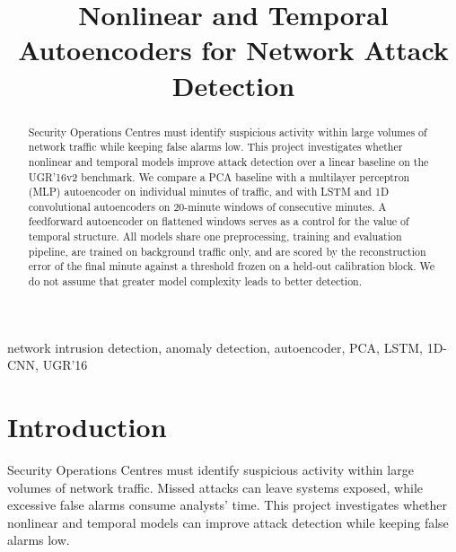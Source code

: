 \documentclass[conference]{IEEEtran}
\begin{document}
\title{Nonlinear and Temporal Autoencoders for Network Attack Detection}

\author{
\and
{}
\and
{}
\and
{}
}

\maketitle

\begin{abstract}
Security Operations Centres must identify suspicious activity within large volumes of network traffic while keeping false alarms low. This project investigates whether nonlinear and temporal models improve attack detection over a linear baseline on the UGR'16v2 benchmark. We compare a PCA baseline with a multilayer perceptron (MLP) autoencoder on individual minutes of traffic, and with LSTM and 1D convolutional autoencoders on 20-minute windows of consecutive minutes. A feedforward autoencoder on flattened windows serves as a control for the value of temporal structure. All models share one preprocessing, training and evaluation pipeline, are trained on background traffic only, and are scored by the reconstruction error of the final minute against a threshold frozen on a held-out calibration block. We do not assume that greater model complexity leads to better detection.
\end{abstract}

\begin{IEEEkeywords}
network intrusion detection, anomaly detection, autoencoder, PCA, LSTM, 1D-CNN, UGR'16
\end{IEEEkeywords}

\section{Introduction}
Security Operations Centres must identify suspicious activity within large volumes of network traffic. Missed attacks can leave systems exposed, while excessive false alarms consume analysts' time. This project investigates whether nonlinear and temporal models can improve attack detection while keeping false alarms low.
\end{document}
